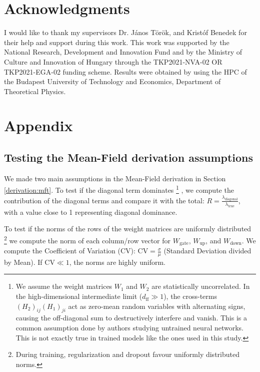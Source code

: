 \documentclass[a4paper,12pt]{article}
\begin{document}
    \section{Acknowledgments }
    \label{sec:acknowledgements}

    I would like to thank my supervisors Dr. János Török, and Kristóf Benedek for their help and support during this work. This work was supported by the National Research, Development and Innovation Fund and by the Ministry of Culture and Innovation of Hungary through the TKP2021-NVA-02 OR TKP2021-EGA-02 funding scheme. Results were obtained by using the HPC of the Budapest University of Technology and Economics, Department of Theoretical Physics.

    \newpage
    \printbibliography

    \section{Appendix}
    \label{sec:appendix}

    \subsection{Testing the Mean-Field derivation assumptions} \label{numerical:mft}

    We made two main assumptions in the Mean-Field derivation in Section \ref{derivation:mft}. To test if the diagonal term dominates
    \footnote{We assume the weight matrices $W_1$ and $W_2$ are statistically uncorrelated. In the high-dimensional intermediate limit ($d_{\text{ff}} \gg 1$), the cross-terms $(H_2)_{ij} (H_1)_{ji}$ act as zero-mean random variables with alternating signs, causing the off-diagonal sum to destructively interfere and vanish. This is a common assumption done by authors studying untrained neural networks. This is not exactly true in trained models like the ones used in this study.}
    , we compute the contribution of the diagonal terms and compare it with the total:
    $R = \frac{\lambda_{\text{diagonal}}}{\lambda_{\text{true}}}$,
    with a value close to 1 representing diagonal dominance.
    
    To test if the norms of the rows of the weight matrices are uniformly distributed \footnote{During training, regularization and dropout favour uniformly distributed norms.}
    we compute the norm of each column/row vector for $W_{\text{gate}}$, $W_{\text{up}}$, and $W_{\text{down}}$. We compute the Coefficient of Variation (CV): $\text{CV} = \frac{\sigma}{\mu}$ (Standard Deviation divided by Mean). If $\text{CV} \ll 1$, the norms are highly uniform. 
\end{document}
